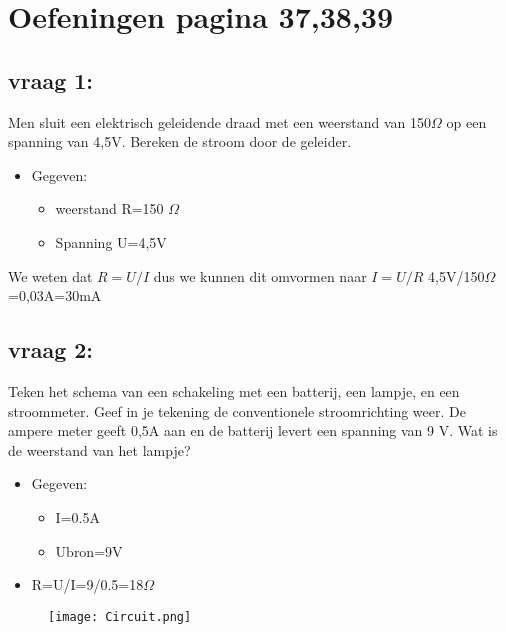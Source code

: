 \documentclass[12pt]{article}
\begin{document}
{}
\section{Oefeningen pagina 37,38,39}
\subsection{vraag 1:}
Men sluit een elektrisch geleidende draad met een weerstand van 150$\Omega$ op een spanning van 4,5V. Bereken de stroom door de geleider.\begin{itemize}
    \item[] Gegeven:\begin{itemize}
    \item weerstand R=150 $\Omega$
    \item Spanning U=4,5V
\end{itemize}
\end{itemize}
We weten dat $R=U/I$ dus we kunnen dit omvormen naar $I=U/R$
4,5V/150$\Omega$=0,03A=30mA
\subsection{vraag 2:}
Teken het schema van een schakeling met een batterij, een lampje, en een stroommeter. Geef in
je tekening de conventionele stroomrichting weer. De ampere meter geeft 0,5A aan en de
batterij levert een spanning van 9 V. Wat is de weerstand van het lampje?
\begin{itemize}
    \item[] Gegeven:\begin{itemize}
        \item I=0.5A 
        \item Ubron=9V
    \end{itemize}
\end{itemize}
\begin{itemize}
    \item R=U/I=9/0.5=18$\Omega$
\end{itemize}
\begin{figure}[ht]
    \centering
    \texttt{[image: Circuit.png]}
\end{figure}
\end{document}
